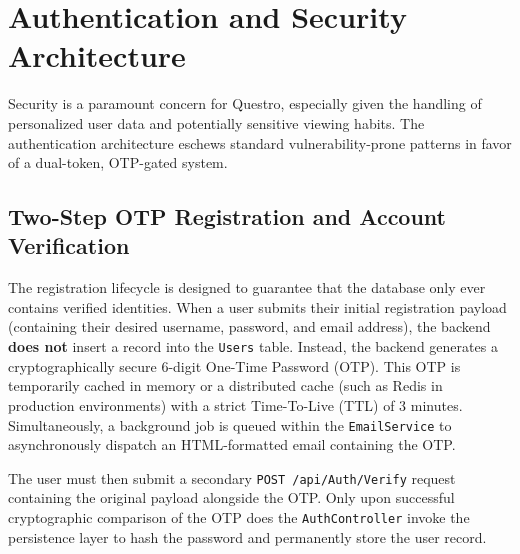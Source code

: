 \section{Authentication and Security Architecture}
Security is a paramount concern for Questro, especially given the handling of personalized user data and potentially sensitive viewing habits. The authentication architecture eschews standard vulnerability-prone patterns in favor of a dual-token, OTP-gated system.

\subsection{Two-Step OTP Registration and Account Verification}
The registration lifecycle is designed to guarantee that the database only ever contains verified identities. 
When a user submits their initial registration payload (containing their desired username, password, and email address), the backend \textbf{does not} insert a record into the \texttt{Users} table. Instead, the backend generates a cryptographically secure 6-digit One-Time Password (OTP). This OTP is temporarily cached in memory or a distributed cache (such as Redis in production environments) with a strict Time-To-Live (TTL) of 3 minutes.
Simultaneously, a background job is queued within the \texttt{EmailService} to asynchronously dispatch an HTML-formatted email containing the OTP. 

The user must then submit a secondary \texttt{POST /api/Auth/Verify} request containing the original payload alongside the OTP. Only upon successful cryptographic comparison of the OTP does the \texttt{AuthController} invoke the persistence layer to hash the password and permanently store the user record.

